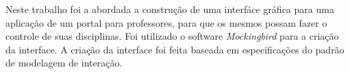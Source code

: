 \begin{resumo} 
Neste trabalho foi a abordada a construção de uma interfáce gráfica para uma 
aplicação de um portal para professores, para  que os mesmos possam fazer
o controle de suas disciplinas.
Foi utilizado o software \textsl{Mockingbird} para a criação da interface. 
A criação da interface foi feita baseada em especificações do padrão de modelagem de
interação.



\end{resumo}

